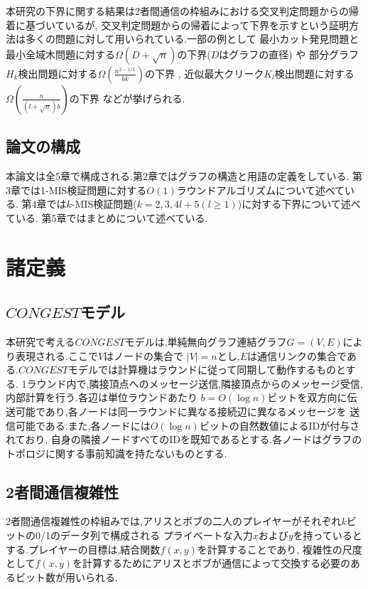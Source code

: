 \documentclass[12pt]{thesis}
\theoremstyle{definition}
\begin{document}
本研究の下界に関する結果は2者間通信の枠組みにおける交叉判定問題からの帰着に基づいているが,
交叉判定問題からの帰着によって下界を示すという証明方法は多くの問題に対して用いられている.一部の例として
最小カット発見問題と最小全域木問題に対する$\Omega (D + \sqrt{n})$の下界($D$はグラフの直径) \cite{sarma2012distributed}や
部分グラフ$H_{k}$検出問題に対する$\Omega (\frac{n^{2 - 1/k}}{bk})$の下界 \cite{fischer2018possibilities},
近似最大クリーク$K_{l}$検出問題に対する$\Omega (\frac{n}{(l + \sqrt{n})b})$の下界 \cite{czumaj2020detecting}などが挙げられる.

\section{論文の構成}
本論文は全5章で構成される.第2章ではグラフの構造と用語の定義をしている.
第3章では1-MIS検証問題に対する$O(1)$ラウンドアルゴリズムについて述べている.
第4章では$k$-MIS検証問題($k = 2, 3, 4l + 5 ( l \geq 1)$)に対する下界について述べている.
第5章ではまとめについて述べている.

\chapter{諸定義}

\section{$CONGEST$モデル}
本研究で考える$CONGEST$モデルは,単純無向グラフ連結グラフ$G = (V, E)$により表現される.ここで$V$はノードの集合で
$|V| = n$とし,$E$は通信リンクの集合である.$CONGEST$モデルでは計算機はラウンドに従って同期して動作するものとする.
1ラウンド内で,隣接頂点へのメッセージ送信,隣接頂点からのメッセージ受信,内部計算を行う.各辺は単位ラウンドあたり
$b = O(\log n)$ビットを双方向に伝送可能であり,各ノードは同一ラウンドに異なる接続辺に異なるメッセージを
送信可能である.また,各ノードには$O(\log n)$ビットの自然数値によるIDが付与されており,
自身の隣接ノードすべてのIDを既知であるとする.各ノードはグラフのトポロジに関する事前知識を持たないものとする.

\section{2者間通信複雑性}
2者間通信複雑性の枠組みでは,アリスとボブの二人のプレイヤーがそれぞれ$k$ビットの0/1のデータ列で構成される
プライベートな入力$x$および$y$を持っているとする.プレイヤーの目標は,結合関数$f(x, y)$を計算することであり,
複雑性の尺度として$f(x, y)$を計算するためにアリスとボブが通信によって交換する必要のあるビット数が用いられる.
\end{document}
